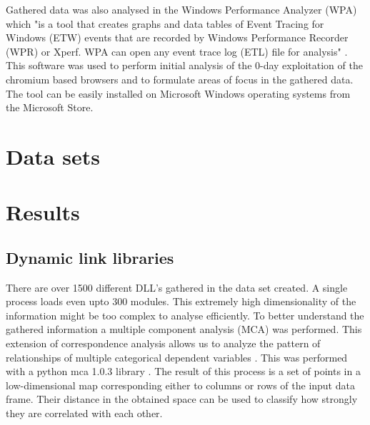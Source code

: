 \documentclass[a4paper,twoside,12pt]{book}
\begin{document}
Gathered data was also analysed in the Windows Performance Analyzer (WPA) which "is a tool that 
creates graphs and data tables of Event Tracing for Windows (ETW) events that are recorded 
by Windows Performance Recorder (WPR) or Xperf. WPA can open any event trace log (ETL) file 
for analysis" \cite{bib:wpa}. This software was used to perform initial analysis of the 0-day 
exploitation of the chromium based browsers and to formulate areas of focus in the gathered data. 
The tool can be easily installed on Microsoft Windows operating systems from the Microsoft Store.



\section{Data sets}


\section{Results}

\subsection{Dynamic link libraries}
There are over 1500 different DLL's gathered in the data set created. A single process loads 
even upto 300 modules. This extremely high dimensionality of the information might be too complex 
to analyse efficiently. To better understand the gathered information a multiple component 
analysis (MCA) was performed. This extension of correspondence analysis allows us to analyze the 
pattern of relationships of multiple categorical dependent variables \cite{bib:mca}. This was performed 
with a python mca 1.0.3 library \cite{bib:pymca}. The result of this process is a set of points in a 
low-dimensional map corresponding either to columns or rows of the input data frame. Their 
distance in the obtained space can be used to classify how strongly they are correlated with 
each other. 
\end{document}
